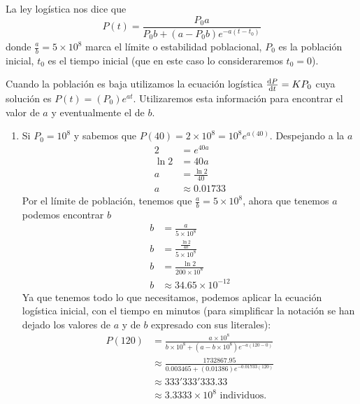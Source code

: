 \documentclass[14pt]{extarticle}
\begin{document}
\begin{enumerate}
{        	\color{azul}
        	La ley logística nos dice que
        	\[
        	P(t)=\frac{P_0 a}{P_0 b+(a-P_0 b)e^{-a(t-t_0)}}
        	\]
        	donde $\frac{a}{b}=5\times 10^8$ marca el límite o estabilidad
        	poblacional, $P_0$ es la población inicial, $t_0$ es el tiempo
        	inicial (que en este caso lo consideraremos $t_0=0$).

        	Cuando la población es baja utilizamos la ecuación logística
        	$\dv{P}{t}=KP_0$ cuya solución es $P(t)=(P_0)e^{at}$. Utilizaremos
        	esta información para encontrar el valor de $a$ y eventualmente el
        	de $b$.
        	\begin{enumerate}
        		\item Si $P_0=10^8$ y sabemos que
        		$P(40)=2\times 10^8=10^8e^{a(40)}$. Despejando a la $a$
        		\begin{align*}
        		2 &= e^{40a}\\
        		\ln{2} &= 40a\\
        		a &= \frac{\ln{2}}{40}\\
        		a &\approx 0.01733
        		\end{align*}
        		Por el límite de población, tenemos que
        		$\frac{a}{b}=5\times 10^8$, ahora que tenemos $a$ podemos
        		encontrar $b$
        		\begin{align*}
        		b &= \frac{a}{5\times 10^8}\\[.2cm]
        		b &= \frac{\frac{\ln{2}}{40}}{5\times 10^8}\\[.2cm]
        		b &= \frac{\ln{2}}{200\times 10^8}\\[.2cm]
        		b &\approx 34.65\times 10^{-12}
        		\end{align*}
        		Ya que tenemos todo lo que necesitamos, podemos aplicar la
        		ecuación logística inicial, con el tiempo en minutos (para
        		simplificar la notación se han dejado los valores de $a$ y de
        		$b$ expresado con sus literales):
        		\begin{align*}
        		P(120) &= \frac{a\times 10^8}
        		{b\times 10^8+(a-b\times 10^8)e^{-a(120-0)}}\\[.3cm]
        		&\approx \frac{1732867.95}{0.003465+(0.01386)
        			e^{-0.01733(120)}}\\
        		&\approx 333'333'333.33\\
        		&\approx 3.3333\times 10^8 \text{ individuos.}
        		\end{align*}


\end{enumerate}}
\end{enumerate}
\end{document}
